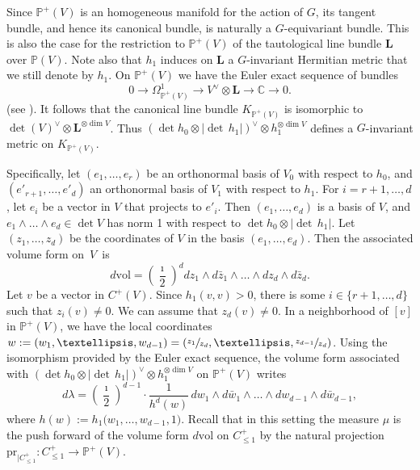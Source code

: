 \documentclass[11pt]{article}
\numberwithin{equation}{section}
\theoremstyle{plain}
\theoremstyle{definition}
\def\C{\mathbb{C}}
\newcommand{\Pb}{\mathbb{P}}
\newcommand{\Lb}{\mathbf{L}}
\newcommand{\vol}{\mathrm{vol}}
\newcommand{\pr}{\mathrm{pr}}
\begin{document}
Since $\Pb^+(V)$ is an homogeneous manifold for the action of $G$, its tangent bundle, and hence its canonical bundle, is naturally a $G$-equivariant bundle. This is also the case for the restriction to $\Pb^+(V)$ of the tautological line bundle $\Lb$ over $\Pb(V)$.
Note also that $h_1$ induces on $\Lb$ a $G$-invariant Hermitian metric that we still denote by $h_1$.
On $\Pb^+(V)$ we have the Euler exact sequence of bundles
\[
0\to \Omega^1_{\Pb^+(V)}\to V^\vee\otimes \Lb\to \C \to 0.
\]
(see \cite[Th.\,II.8.13]{Hart}). It follows that the canonical line bundle $K_{\Pb^+(V)}$ is isomorphic to $\det(V)^\vee\otimes \Lb^{\otimes\dim V}$. Thus $(\det h_0 \otimes |{\det\,} h_1| )^\vee \otimes h_1^{\otimes \dim V }$ defines a $G$-invariant metric on $K_{\Pb^+(V)}$.

Specifically, let $(e_1,\dots,e_r)$ be an orthonormal basis of $V_0$ with respect to $h_0$, and $(e'_{r+1},\dots,e'_d)$ an orthonormal basis of $V_1$ with respect to $h_1$. For $i=r+1,\dots,d$, let $e_i$ be a vector in $V$ that projects to $e'_i$.
Then $(e_1,\dots,e_d)$ is a basis of $V$, and $e_1\wedge\dots\wedge e_d \in \det V$ has norm 1 with respect to $\det h_0 \otimes |{\det\,} h_1|$.
Let $(z_1,\dots,z_d)$ be the coordinates of $V$ in the basis $(e_1,\dots,e_d)$.
Then the associated volume form on~$V$~is
\[
d\vol=\left(\frac{\imath}{2}\right)^{d} dz_1\wedge d\bar{z}_1\wedge\dots\wedge dz_{d}\wedge d\bar{z}_{d}.
\]
Let $v$ be a vector in $C^+(V)$. Since $h_1(v,v)>0$, there is some $i\in \{r+1,\dots,d\}$ such that $z_i(v)\not=0$.
We can assume that $z_d(v)\neq 0$.
In a neighborhood of $[v]$ in $\Pb^+(V)$, we have the local coordinates $w:=(w_1,\dots,w_{d-1})=(\sfrac{z_1}{z_d},\dots,\sfrac{z_{d-1}}{z_d})$. Using the isomorphism provided by the Euler exact sequence, the volume form associated with $(\det h_0 \otimes |{\det\,} h_1| )^\vee \otimes h_1^{\otimes \dim V}$ on $\Pb^+(V)$ writes
\[
d\lambda= \left(\frac{\imath}{2}\right)^{d-1}\cdot\frac{1}{h^d(w)}\, dw_1\wedge d\bar{w}_1\wedge \dots \wedge dw_{d-1}\wedge d\bar{w}_{d-1},
\]
where $h(w):=h_1\bigl(w_1,\dots,w_{d-1},1\bigr)$.
Recall that in this setting the measure $\mu$ is the push forward of the volume form $d\vol$ on $C^+_{\leq 1}$ by the natural projection $\pr_{|C^+_{\leq 1}}: C^+_{\leq 1} \to \Pb^+(V)$.
\end{document}

